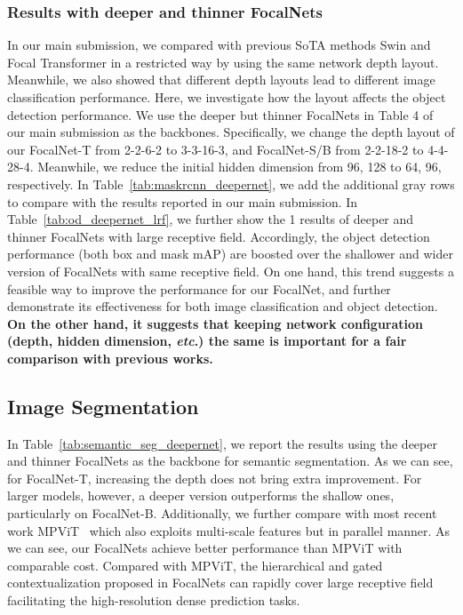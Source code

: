\documentclass{article}
\begin{document}
\subsubsection{Results with deeper and thinner FocalNets} 
In our main submission, we compared with previous SoTA methods Swin and Focal Transformer in a restricted way by using the same network depth layout. Meanwhile, we also showed that different depth layouts lead to different image classification performance. Here, we investigate how the layout affects the object detection performance. We use the deeper but thinner FocalNets in Table 4 of our main submission as the backbones. Specifically, we change the depth layout of our FocalNet-T from 2-2-6-2 to 3-3-16-3, and FocalNet-S/B from 2-2-18-2 to 4-4-28-4. Meanwhile, we reduce the initial hidden dimension from 96, 128 to 64, 96, respectively.
In Table~\ref{tab:maskrcnn_deepernet}, we add the additional gray rows to compare with the results reported in our main submission. In Table~\ref{tab:od_deepernet_lrf}, we further show the 1 results of deeper and thinner FocalNets with large receptive field. Accordingly, the object detection performance (both box and mask mAP) are boosted over the shallower and wider version of FocalNets with same receptive field. On one hand, this trend suggests a feasible way to improve the performance for our FocalNet, and further demonstrate its effectiveness for both image classification and object detection. \textbf{On the other hand, it suggests that keeping network configuration (depth, hidden dimension, \textit{etc}.) the same is important for a fair comparison with previous works.}

\subsection{Image Segmentation}

In Table~\ref{tab:semantic_seg_deepernet}, we report the results using the deeper and thinner FocalNets as the backbone for semantic segmentation. As we can see, for FocalNet-T, increasing the depth does not bring extra improvement. For larger models, however, a deeper version outperforms the shallow ones, particularly on FocalNet-B. Additionally, we further compare with most recent work MPViT~\cite{lee2021mpvit} which also exploits multi-scale features but in parallel manner. As we can see, our FocalNets achieve better performance than MPViT with comparable cost. Compared with MPViT, the hierarchical and gated contextualization proposed in FocalNets can rapidly cover large receptive field facilitating the high-resolution dense prediction tasks. 
\end{document}
